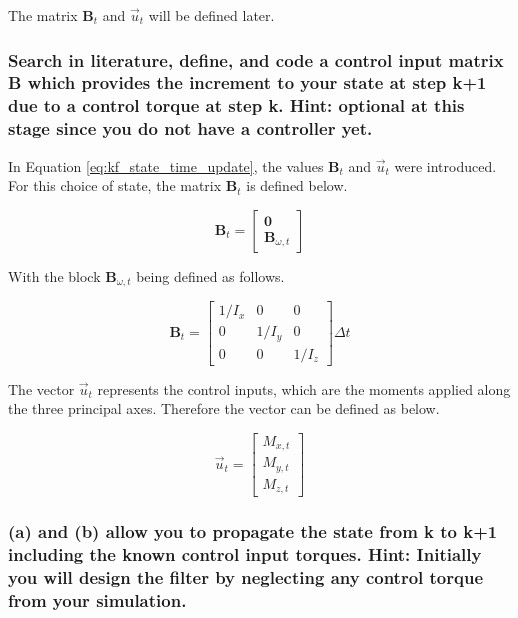 The matrix $\boldsymbol{B}_t$ and $\vec{u}_t$ will be defined later.

\subsubsection{Search in literature, define, and code a control input matrix B which provides the increment to your state at step k+1 due to a control torque at step k. Hint: optional at this stage since you do not have a controller yet.}

In Equation \ref{eq:kf_state_time_update}, the values $\boldsymbol{B}_t$ and $\vec{u}_t$ were introduced. For this choice of state, the matrix $\boldsymbol{B}_t$ is defined below.

\begin{equation*}
    \boldsymbol{B}_t = \begin{bmatrix}
        \boldsymbol{0} \\
        \boldsymbol{B}_{\omega,t}
    \end{bmatrix}
\end{equation*}

With the block $\boldsymbol{B}_{\omega,t}$ being defined as follows.

\begin{equation*}
    \boldsymbol{B}_t = \begin{bmatrix}
        1/I_x & 0 & 0 \\
        0 & 1/I_y & 0 \\
        0 & 0 & 1/I_z
    \end{bmatrix} \Delta t
\end{equation*}

The vector $\vec{u}_t$ represents the control inputs, which are the moments applied along the three principal axes. Therefore the vector can be defined as below.

\begin{equation*}
    \vec{u}_t = \begin{bmatrix}
        M_{x,t} \\ M_{y,t} \\ M_{z,t}
    \end{bmatrix}
\end{equation*}

\subsubsection{(a) and (b) allow you to propagate the state from k to k+1 including the known control input torques. Hint: Initially you will design the filter by neglecting any control torque from your simulation.}

